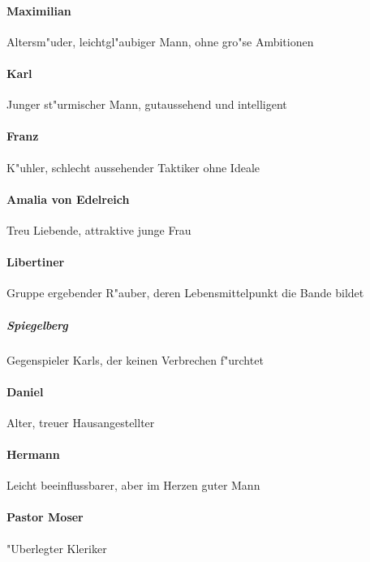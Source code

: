 \paragraph{Maximilian}
Altersm"uder, leichtgl"aubiger Mann, ohne gro"se Ambitionen
\paragraph{Karl}
Junger st"urmischer Mann, gutaussehend und intelligent
\paragraph{Franz}
K"uhler, schlecht aussehender Taktiker ohne Ideale
\paragraph{Amalia von Edelreich}
Treu Liebende, attraktive junge Frau
\paragraph{Libertiner}
Gruppe ergebender R"auber, deren Lebensmittelpunkt die Bande bildet
\subparagraph{Spiegelberg}
Gegenspieler Karls, der keinen Verbrechen f"urchtet
\paragraph{Daniel}
Alter, treuer Hausangestellter
\paragraph{Hermann}
Leicht beeinflussbarer, aber im Herzen guter Mann
\paragraph{Pastor Moser}
"Uberlegter Kleriker